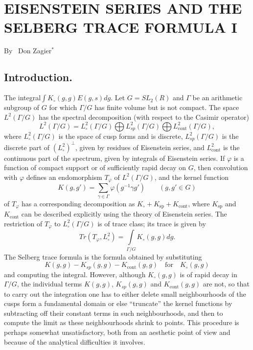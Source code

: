 \chapter[EISENSTEIN SERIES AND THE SELBERG TRACE\hfill\break FORMULA I]{EISENSTEIN SERIES AND THE SELBERG TRACE FORMULA I}

\begin{center}
{\large By~ Don Zagier$^\ast$}
\end{center}

\bigskip

\setcounter{pageoriginal}{302}

\setcounter{section}{-1}
\section{Introduction.}\label{art11-sec0}
The integral\pageoriginale $\int K_\circ (g,g) E (g,s) dg$. Let $G = S L_2 (R)$ and $\Gamma$ be an arithmetic subgroup of $G$ for which $\Gamma / G$ has finite volume but is not compact. The space $L^2 (\Gamma / G)$ has the spectral decomposition (with respect to the Casimir operator)
$$
L^2 (\Gamma / G) = L^2_\circ (\Gamma / G) \bigoplus L^2_{sp} (\Gamma / G) \bigoplus L^2_{\text{cont}} (\Gamma / G),
$$
where $L^2_\circ (\Gamma / G)$ is the space of cusp forms and is discrete, $L^2_{sp} (\Gamma / G)$ is the discrete part of $(L^2_\circ)^\perp$, given by residues of Eisenstein series, and $L^2_{\text{cont}}$ is the continuous part of the spectrum, given by integrals of Eisenstein series. If $\varphi$ is a function of compact support or of sufficiently rapid decay on $G$, then convolution with $\varphi$ defines an endomorphism $T_\varphi$ of $L^2 (\Gamma / G)$, and the kernel function 
\begin{equation*}
K(g, g') = \sum\limits_{\gamma \in \Gamma} \varphi (g^{-1} \gamma g') \qquad (g, g' \in G) \tag{0.1} \label{art11-eq0.1}
\end{equation*}
of $T_\varphi$ has a corresponding decomposition as $K_\circ + K_{\text{sp}} + K_{\text{cont}}$, where $K_{\text{sp}}$ and $K_{\text{cont}}$ can be described explicitly using the theory of Eisenstein series. The restriction of $T_\varphi$ to $L^2_\circ (\Gamma / G)$ is of trace class; its trace is given by 
\begin{equation*}
Tr (T_\varphi, L^2_\circ )  = \int\limits_{\Gamma / G} K_\circ (g, g) dg. \tag{0.2} \label{art11-eq0.2}
\end{equation*}
The Selberg trace formula is the formula obtained by substituting 
$$
K(g,g) - K_{sp} (g,g) - K_{\text{cont}} (g, g)\quad\text{for}\quad K_\circ (g,g)
$$ 
and computing the integral. However, although $K_\circ (g,g)$ is of rapid decay in $\Gamma / G$, the individual terms $K(g,g)$, $K_{sp} (g,g)$ and $K_{\text{cont}} (g,g)$ are not, so that to carry out the integration one has to either delete small neighbourhoods of the cusps form a fundamental domain or else ``truncate'' the kernel functions by subtracting off their constant terms in such neighbourhoods, and then to compute the limit as these neighbourhoods shrink to points. This procedure is perhaps somewhat unsatisfactory, both from an aesthetic point of view and because of the analytical difficulties it involves.


